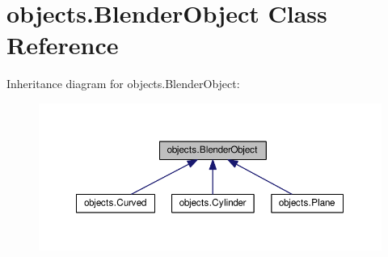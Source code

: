 \hypertarget{classobjects_1_1BlenderObject}{}\section{objects.\+Blender\+Object Class Reference}
\label{classobjects_1_1BlenderObject}


Inheritance diagram for objects.\+Blender\+Object\+:\nopagebreak
\begin{figure}[H]
\begin{center}
\leavevmode
\includegraphics[width=350pt]{classobjects_1_1BlenderObject__inherit__graph}
\end{center}
\end{figure}
